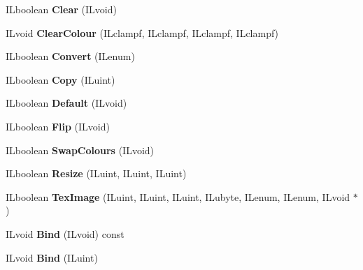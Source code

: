 \begin{DoxyCompactItemize}
\item 
\hypertarget{classilImage_a95bd51fae45e7d2382004526ecf06d06}{
ILboolean {\bfseries Clear} (ILvoid)}
\label{classilImage_a95bd51fae45e7d2382004526ecf06d06}

\item 
\hypertarget{classilImage_a61e2c49839a48e56af595f95e52fde76}{
ILvoid {\bfseries ClearColour} (ILclampf, ILclampf, ILclampf, ILclampf)}
\label{classilImage_a61e2c49839a48e56af595f95e52fde76}

\item 
\hypertarget{classilImage_a6b0991b943109549e874ae3a5c161ee6}{
ILboolean {\bfseries Convert} (ILenum)}
\label{classilImage_a6b0991b943109549e874ae3a5c161ee6}

\item 
\hypertarget{classilImage_a0cb50014832fdb0ac45a345804c8da50}{
ILboolean {\bfseries Copy} (ILuint)}
\label{classilImage_a0cb50014832fdb0ac45a345804c8da50}

\item 
\hypertarget{classilImage_acb7643617c584b8a44443ef1255e7dc4}{
ILboolean {\bfseries Default} (ILvoid)}
\label{classilImage_acb7643617c584b8a44443ef1255e7dc4}

\item 
\hypertarget{classilImage_a908924316c545bc81e688d6d5c6dc71d}{
ILboolean {\bfseries Flip} (ILvoid)}
\label{classilImage_a908924316c545bc81e688d6d5c6dc71d}

\item 
\hypertarget{classilImage_a879d438f27df6b5be69f87e9a9e81f32}{
ILboolean {\bfseries SwapColours} (ILvoid)}
\label{classilImage_a879d438f27df6b5be69f87e9a9e81f32}

\item 
\hypertarget{classilImage_aeefe83c3a39c37600868c29d4afb8294}{
ILboolean {\bfseries Resize} (ILuint, ILuint, ILuint)}
\label{classilImage_aeefe83c3a39c37600868c29d4afb8294}

\item 
\hypertarget{classilImage_a06975135177b41ea110cc562944612f4}{
ILboolean {\bfseries TexImage} (ILuint, ILuint, ILuint, ILubyte, ILenum, ILenum, ILvoid $\ast$)}
\label{classilImage_a06975135177b41ea110cc562944612f4}

\item 
\hypertarget{classilImage_a05a8fd86f08ef3e59ee668542dc77a34}{
ILvoid {\bfseries Bind} (ILvoid) const }
\label{classilImage_a05a8fd86f08ef3e59ee668542dc77a34}

\item 
\hypertarget{classilImage_a357703ce3155b430ba8997e109d15a1c}{
ILvoid {\bfseries Bind} (ILuint)}
\label{classilImage_a357703ce3155b430ba8997e109d15a1c}


\end{DoxyCompactItemize}
